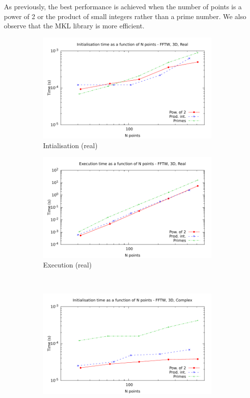 \documentclass[12pt, a4paper]{article}
\begin{document}
As previously, the best performance is achieved when the number of points is a power of 2 or the product of small integers rather than a prime number. We also observe that the MKL library is more efficient.
\begin{figure}[H]
\captionsetup{width=0.8\linewidth}
\centering
\begin{subfigure}{.5\textwidth}
\centering
\includegraphics[width=.9\linewidth]{graphs/3d-fftw-init-r.pdf}
\caption{Intialisation (real)}
\label{3DFFTWRI}
\end{subfigure}%
\begin{subfigure}{.5\textwidth}
\centering
\includegraphics[width=.9\linewidth]{graphs/3d-fftw-exec-r.pdf}
\caption{Execution (real)}
\label{3DFFTWR}
\end{subfigure}\\
\begin{subfigure}{.5\textwidth}
\centering
\includegraphics[width=.9\linewidth]{graphs/3d-fftw-init-c.pdf}

\end{subfigure}
\end{figure}
\end{document}
